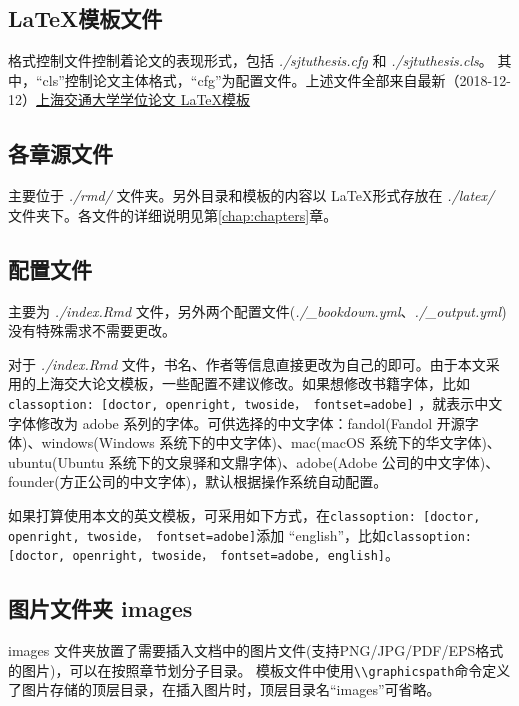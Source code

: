 \documentclass[doctor,openright,twoside]{sjtuthesis}
\newcommand{\passthrough}[1]{#1}
\theoremstyle{plain}
\theoremstyle{definition}
\theoremstyle{remark}
\theoremstyle{ocrenumbox}
\theoremstyle{plain}
\newcommand\cqh{“}
\newcommand\cqt{”}
\begin{document}
\subsection{\texorpdfstring{\LaTeX 模板文件}{模板文件}}

格式控制文件控制着论文的表现形式，包括 \emph{./sjtuthesis.cfg} 和
\emph{./sjtuthesis.cls}。
其中，\cqh cls\cqt 控制论文主体格式，\cqh cfg\cqt 为配置文件。上述文件全部来自最新（2018-12-12）\href{https://github.com/sjtug/SJTUThesis}{上海交通大学学位论文
\LaTeX 模板}

\subsection{各章源文件}

主要位于 \emph{./rmd/} 文件夹。另外目录和模板的内容以 \LaTeX 形式存放在
\emph{./latex/} 文件夹下。各文件的详细说明见第\ref{chap:chapters}章。

\hypertarget{-1}{%
\subsection{配置文件}\label{-1}}

主要为 \emph{./index.Rmd}
文件，另外两个配置文件(\emph{./\_bookdown.yml}、\emph{./\_output.yml})没有特殊需求不需要更改。

对于 \emph{./index.Rmd}
文件，书名、作者等信息直接更改为自己的即可。由于本文采用的上海交大论文模板，一些配置不建议修改。如果想修改书籍字体，比如
\passthrough{\lstinline!classoption: [doctor, openright, twoside， fontset=adobe]!}
，就表示中文字体修改为 adobe
系列的字体。可供选择的中文字体：fandol(Fandol 开源字体)、windows(Windows
系统下的中文字体)、mac(macOS 系统下的华文字体)、ubuntu(Ubuntu
系统下的文泉驿和文鼎字体)、adobe(Adobe
公司的中文字体)、founder(方正公司的中文字体)，默认根据操作系统自动配置。

如果打算使用本文的英文模板，可采用如下方式，在\passthrough{\lstinline!classoption: [doctor, openright, twoside， fontset=adobe]!}添加
``english''，比如\passthrough{\lstinline!classoption: [doctor, openright, twoside， fontset=adobe, english]!}。

\hypertarget{intro:fig}{%
\subsection{图片文件夹 images}\label{intro:fig}}

images
文件夹放置了需要插入文档中的图片文件(支持PNG/JPG/PDF/EPS格式的图片)，可以在按照章节划分子目录。
模板文件中使用\passthrough{\lstinline!\\graphicspath!}命令定义了图片存储的顶层目录，在插入图片时，顶层目录名\cqh images\cqt 可省略。
\end{document}
